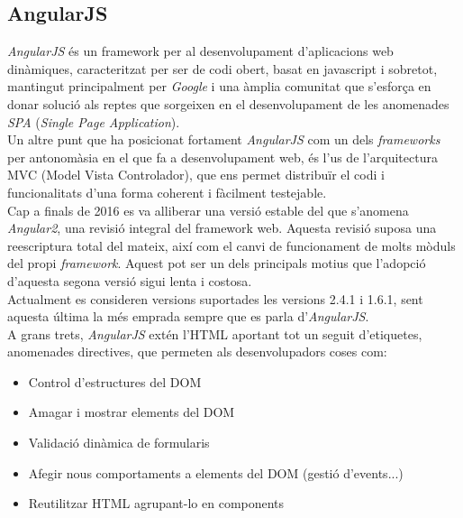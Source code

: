 \subsection{AngularJS}
\textit{AngularJS} és un framework per al desenvolupament d'aplicacions web dinàmiques, caracteritzat per ser de codi obert, basat en javascript i sobretot, mantingut principalment per \textit{Google} i una àmplia comunitat que s'esforça en donar solució als reptes que sorgeixen en el desenvolupament de les anomenades \textit{SPA} (\textit{Single Page Application}).\\
\newline Un altre punt que ha posicionat fortament \textit{AngularJS} com un dels \textit{frameworks} per antonomàsia en el que fa a desenvolupament web, és l'us de l'arquitectura MVC (Model Vista Controlador), que ens permet distribuïr el codi i funcionalitats d'una forma coherent i fàcilment testejable.\\
\newline Cap a finals de 2016 es va alliberar una versió estable del que s'anomena \textit{Angular2}, una revisió integral del framework web. Aquesta revisió suposa una reescriptura total del mateix, així com el canvi de funcionament de molts mòduls del propi \textit{framework}. Aquest pot ser un dels principals motius que l'adopció d'aquesta segona versió sigui lenta i costosa. \\
\newline Actualment es consideren versions suportades les versions 2.4.1 i 1.6.1, sent aquesta última la més emprada sempre que es parla d'\textit{AngularJS}.\\
\newline A grans trets, \textit{AngularJS} extén l'HTML aportant tot un seguit d'etiquetes, anomenades directives, que permeten als desenvolupadors coses com:
\begin{itemize}
    \item Control d'estructures del DOM
    \item Amagar i mostrar elements del DOM
    \item Validació dinàmica de formularis
    \item Afegir nous comportaments a elements del DOM (gestió d'events...)
    \item Reutilitzar HTML  agrupant-lo en components
\end{itemize}

